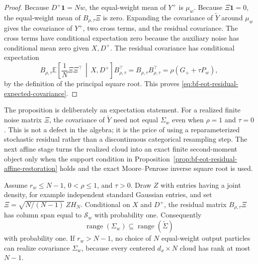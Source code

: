 \begin{proof}
Because \(D^+\mathbf 1=Nw\), the equal-weight mean of \(Y^+\) is \(\mu_w\).
Because \(\Xi\mathbf 1=0\), the equal-weight mean of \(B_{\rho,\tau}\Xi\) is
zero.  Expanding the covariance of \(\widetilde Y\) around \(\mu_w\) gives the
covariance of \(Y^+\), two cross terms, and the residual covariance.  The cross
terms have conditional expectation zero because the auxiliary noise has
conditional mean zero given \(X,D^+\).  The residual covariance has conditional
expectation
\[
  B_{\rho,\tau}
  \mathbb E\!\left[\frac1N\Xi\Xi^\top\,\middle|\,X,D^+\right]
  B_{\rho,\tau}^\top
  =
  B_{\rho,\tau}B_{\rho,\tau}^\top
  =
  \rho(G_+ + \tau P_w),
\]
by the definition of the principal square root.  This proves
\eqref{eq:bf-eot-residual-expected-covariance}.
\end{proof}

The proposition is deliberately an expectation statement.  For a realized finite
noise matrix \(\Xi\), the covariance of \(\widetilde Y\) need not equal
\(\Sigma_w\) even when \(\rho=1\) and \(\tau=0\).  This is not a defect in the
algebra; it is the price of using a reparameterized stochastic residual rather
than a discontinuous categorical resampling step.  The next affine stage turns
the realized cloud into an exact finite second-moment object only when the
support condition in Proposition~\ref{prop:bf-eot-residual-affine-restoration}
holds and the exact Moore--Penrose inverse square root is used.

\begin{proposition}
\label{prop:bf-eot-residual-support-repair}
Assume \(r_w\le N-1\), \(0<\rho\le1\), and \(\tau>0\).  Draw \(Z\) with
entries having a joint density, for example independent standard Gaussian
entries, and set
\(\Xi=\sqrt{N/(N-1)}\,ZH_N\).  Conditional on \(X\) and \(D^+\), the residual
matrix \(B_{\rho,\tau}\Xi\) has column span equal to \(\mathcal S_w\) with
probability one.  Consequently
\[
  \operatorname{range}(\Sigma_w)
  \subseteq
  \operatorname{range}(\widetilde\Sigma)
\]
with probability one.  If \(r_w>N-1\), no choice of \(N\) equal-weight output
particles can realize covariance \(\Sigma_w\), because every centered
\(d_x\times N\) cloud has rank at most \(N-1\).
\end{proposition}

